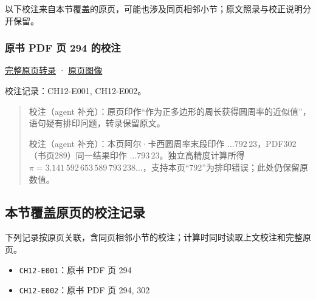 \documentclass[
  10pt,
  fontset=fandol]{ctexart}
\providecommand{\tightlist}{%
  \setlength{\itemsep}{0pt}\setlength{\parskip}{0pt}}
\begin{document}
以下校注来自本节覆盖的原页，可能也涉及同页相邻小节；原文照录与校正说明分开保留。

\subsubsection{原书 PDF 页 294 的校注}\label{ux539fux4e66-pdf-ux9875-294-ux7684ux6821ux6ce8}

\href{../pages/pdf-294.md}{完整原页转录} · \href{../../source-images/pdf-294.jpeg}{原页图像}

校注记录：CH12-E001, CH12-E002。

\begin{quote}
校注（agent 补充）：原页印作``作为正多边形的周长获得圆周率的近似值''，语句疑有排印问题，转录保留原文。

校注（agent 补充）：本页阿尔·卡西圆周率末段印作 \(\ldots792\,23\)，PDF302（书页289）同一结果印作 \(\ldots793\,23\)。独立高精度计算所得 \(\pi=3.141\,592\,653\,589\,793\,238\ldots\)，支持本页``792''为排印错误；此处仍保留原数值。
\end{quote}

\subsection{本节覆盖原页的校注记录}\label{ux672cux8282ux8986ux76d6ux539fux9875ux7684ux6821ux6ce8ux8bb0ux5f55}

下列记录按原页关联，含同页相邻小节的校注；计算时同时读取上文校注和完整原页。

\begin{itemize}
\tightlist
\item
  \texttt{CH12-E001}：原书 PDF 页 294
\item
  \texttt{CH12-E002}：原书 PDF 页 294, 302
\end{itemize}
\end{document}
